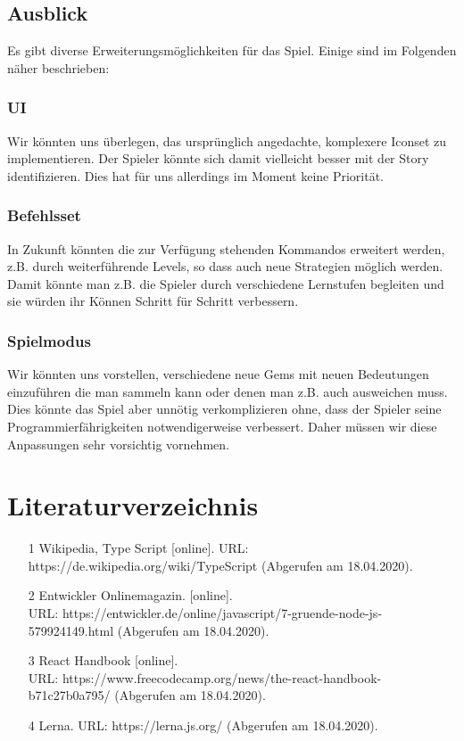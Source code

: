 \documentclass[11pt,a4paper,titlepage]{article}
\begin{document}
\subsection{Ausblick}

Es gibt diverse Erweiterungsmöglichkeiten für das Spiel. Einige sind im Folgenden näher beschrieben:

\subsubsection{UI}
Wir könnten uns überlegen, das ursprünglich angedachte, komplexere Iconset zu implementieren. Der Spieler könnte sich damit vielleicht besser mit der Story identifizieren. Dies hat für uns allerdings im Moment keine Priorität.

\subsubsection{Befehlsset}
In Zukunft könnten die zur Verfügung stehenden Kommandos erweitert werden, z.B. durch weiterführende Levels, so dass auch neue Strategien möglich werden. Damit könnte man z.B. die Spieler durch verschiedene Lernstufen begleiten und sie würden ihr Können Schritt für Schritt verbessern.

\subsubsection{Spielmodus}
Wir könnten uns vorstellen, verschiedene neue Gems mit neuen Bedeutungen einzuführen die man sammeln kann oder denen man z.B. auch ausweichen muss. Dies könnte das Spiel aber unnötig verkomplizieren ohne, dass der Spieler seine Programmierfährigkeiten notwendigerweise verbessert. Daher müssen wir diese Anpassungen sehr vorsichtig vornehmen.

\section{Literaturverzeichnis}

\begin{itemize}
\item [1] Wikipedia, Type Script [online]. URL: https://de.wikipedia.org/wiki/TypeScript (Abgerufen am 18.04.2020).
\item [2] Entwickler Onlinemagazin.  [online]. \\URL: https://entwickler.de/online/javascript/7-gruende-node-js-579924149.html (Abgerufen am 18.04.2020).
\item [3] React Handbook [online]. \\URL: https://www.freecodecamp.org/news/the-react-handbook-b71c27b0a795/ (Abgerufen am 18.04.2020).
\item [4] Lerna. URL: https://lerna.js.org/ (Abgerufen am 18.04.2020).
\end{itemize}
\end{document}
